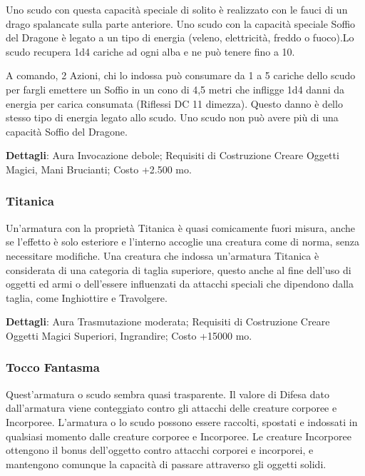 \begin{multicols}{2}
Uno scudo con questa capacità speciale di solito è realizzato con le fauci di un drago spalancate sulla parte anteriore. Uno scudo con la capacità speciale Soffio del Dragone è legato a un tipo di energia (veleno, elettricità, freddo o fuoco).Lo scudo recupera 1d4 cariche ad ogni alba e ne può tenere fino a 10.

A comando, 2 Azioni, chi lo indossa può consumare da 1 a 5 cariche dello scudo per fargli emettere un Soffio in un cono di 4,5 metri che infligge 1d4 danni da energia per carica consumata (Riflessi DC 11 dimezza). Questo danno è dello stesso tipo di energia legato allo scudo. Uno scudo non può avere più di una capacità Soffio del Dragone.

\textbf{Dettagli}: Aura Invocazione debole; Requisiti di Costruzione Creare Oggetti Magici, Mani Brucianti; Costo +2.500 mo.

\subsubsection*{Titanica}

Un'armatura con la proprietà Titanica è quasi comicamente fuori misura, anche se l'effetto è solo esteriore e l'interno accoglie una creatura come di norma, senza necessitare modifiche. Una creatura che indossa un'armatura Titanica è considerata di una categoria di taglia superiore, questo anche al fine dell'uso di oggetti ed armi o dell'essere influenzati da attacchi speciali che dipendono dalla taglia, come Inghiottire e Travolgere.

\textbf{Dettagli}: Aura Trasmutazione moderata; Requisiti di Costruzione Creare Oggetti Magici Superiori, Ingrandire; Costo +15000 mo.

\subsubsection*{Tocco Fantasma}

Quest'armatura o scudo sembra quasi trasparente. Il valore di Difesa dato dall'armatura viene conteggiato contro gli attacchi delle creature corporee e Incorporee. L'armatura o lo scudo possono essere raccolti, spostati e indossati in qualsiasi momento dalle creature corporee e Incorporee. Le creature Incorporee ottengono il bonus dell'oggetto contro attacchi corporei e incorporei, e mantengono comunque la capacità di passare attraverso gli oggetti solidi.


\end{multicols}
